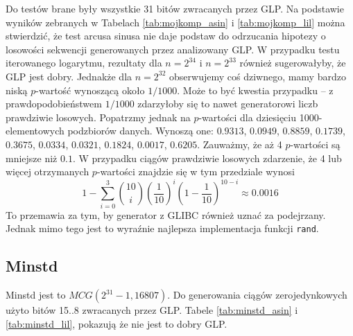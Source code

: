 \documentclass[a4paper,11pt,twoside]{book}
\theoremstyle{definition}
\begin{document}
Do testów brane były wszystkie 31 bitów zwracanych przez GLP. Na podstawie wyników zebranych w Tabelach \ref{tab:mojkomp_asin} i \ref{tab:mojkomp_lil} można stwierdzić, że test arcusa sinusa nie daje podstaw do odrzucania hipotezy o losowości sekwencji generowanych przez analizowany GLP. W przypadku testu iterowanego logarytmu, rezultaty dla $n=2^{34}$ i $n=2^{33}$ również sugerowałyby, że GLP jest dobry. Jednakże dla $n=2^{32}$ obserwujemy coś dziwnego, mamy bardzo niską $p$-wartość wynoszącą około $1/1000$. Może to być kwestia przypadku -- z prawdopodobieństwem $1/1000$ zdarzyłoby się to nawet generatorowi liczb prawdziwie losowych. Popatrzmy jednak na $p$-wartości dla dziesięciu 1000-elementowych podzbiorów danych. Wynoszą one: $0.9313$, $0.0949$, $0.8859$, $0.1739$, $0.3675$, $0.0334$, $0.0321$, $0.1824$, $0.0017$, $0.6205$. Zauważmy, że aż 4 $p$-wartości są mniejsze niż $0.1$. W przypadku ciągów prawdziwie losowych zdarzenie, że 4 lub więcej otrzymanych $p$-wartości znajdzie się w tym przedziale wynosi
\[ 1 - \sum_{i=0}^3 \binom{10}{i} \left(\frac{1}{10}\right)^{i} \left(1 - \frac{1}{10}\right)^{10-i} \approx 0.0016 \]
To przemawia za tym, by generator z GLIBC również uznać za podejrzany. Jednak mimo tego jest to wyraźnie najlepsza implementacja funkcji \texttt{rand}.

\FloatBarrier
\subsection{Minstd}
Minstd jest to $MCG(2^{31}-1, 16807)$. Do generowania ciągów zerojedynkowych użyto bitów 15..8 zwracanych przez GLP. Tabele \ref{tab:minstd_asin} i \ref{tab:minstd_lil}, pokazują że nie jest to dobry GLP. 
\end{document}
